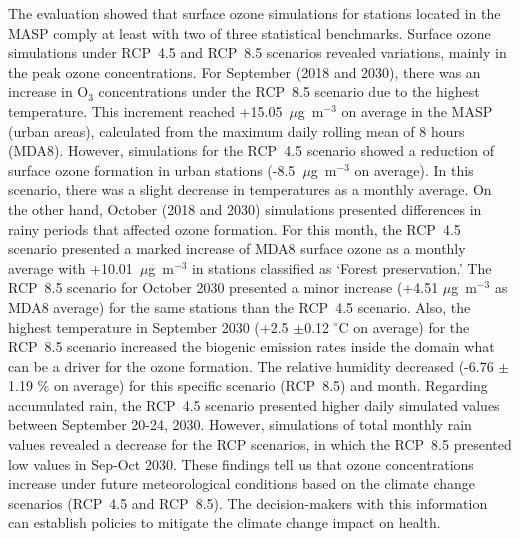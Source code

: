 \begin{spacing}{1.5}
The evaluation showed that surface ozone simulations for stations located in the MASP comply at least with two of three statistical benchmarks.
Surface ozone simulations under RCP~4.5 and RCP~8.5 scenarios revealed variations, mainly in the peak ozone concentrations.
For September (2018 and 2030), there was an increase in O$_3$ concentrations under the RCP~8.5 scenario due to the highest temperature. This increment reached +15.05~$\mu$g~m$^{-3}$ on average in the MASP (urban areas), calculated from the maximum daily rolling mean of 8 hours (MDA8). However, simulations for the RCP~4.5 scenario showed a reduction of surface ozone formation in urban stations (-8.5~$\mu$g~m$^{-3}$ on average). In this scenario, there was a slight decrease in temperatures as a monthly average.
On the other hand, October (2018 and 2030) simulations presented differences in rainy periods that affected ozone formation. For this month, the RCP~4.5 scenario presented a marked increase of MDA8 surface ozone as a monthly average with +10.01~$\mu$g~m$^{-3}$ in stations classified as `Forest preservation.' The RCP~8.5 scenario for October 2030 presented a minor increase (+4.51 $\mu$g~m$^{-3}$ as MDA8 average) for the same stations than the RCP~4.5 scenario.
Also, the highest temperature in September 2030 (+2.5 $\pm$0.12 $^{\circ}$C on average) for the RCP~8.5 scenario increased the biogenic emission rates inside the domain what can be a driver for the ozone formation.  
The relative humidity decreased (-6.76 $\pm$1.19 \% on average) for this specific scenario (RCP~8.5) and month. Regarding accumulated rain, the RCP~4.5 scenario presented higher daily simulated values between September 20-24, 2030. However, simulations of total monthly rain values revealed a decrease for the RCP scenarios, in which the RCP~8.5 presented low values in Sep-Oct 2030. 
These findings tell us that ozone concentrations increase under future meteorological conditions based on the climate change scenarios (RCP~4.5 and RCP~8.5). The decision-makers with this information can establish policies to mitigate the climate change impact on health.

	\cleardoublepage
	

\end{spacing}
